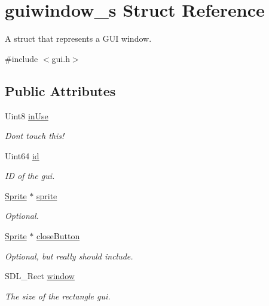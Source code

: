 \hypertarget{structguiwindow__s}{}\section{guiwindow\+\_\+s Struct Reference}
\label{structguiwindow__s}


A struct that represents a G\+UI window.  




{\ttfamily \#include $<$gui.\+h$>$}

\subsection*{Public Attributes}
\begin{DoxyCompactItemize}
\item 
\mbox{\label{structguiwindow__s_a31241d3d16a5e55ea1025fd08e5835bd}} 
Uint8 \hyperlink{structguiwindow__s_a31241d3d16a5e55ea1025fd08e5835bd}{in\+Use}
\begin{DoxyCompactList}\small\item\em Don\textquotesingle{}t touch this! \end{DoxyCompactList}\item 
Uint64 \hyperlink{structguiwindow__s_a8517fe666071281d8060f4f59459623f}{id}
\begin{DoxyCompactList}\small\item\em ID of the gui. \end{DoxyCompactList}\item 
\hyperlink{struct_sprite___s}{Sprite} $\ast$ \hyperlink{structguiwindow__s_a44df1a42aae23bae63ec9a7a9243b80e}{sprite}
\begin{DoxyCompactList}\small\item\em Optional. \end{DoxyCompactList}\item 
\hyperlink{struct_sprite___s}{Sprite} $\ast$ \hyperlink{structguiwindow__s_ac2a0369e93d29393cf3b5353a989dc9b}{close\+Button}
\begin{DoxyCompactList}\small\item\em Optional, but really should include. \end{DoxyCompactList}\item 
S\+D\+L\+\_\+\+Rect \hyperlink{structguiwindow__s_a4f1cb1337e6c6ea0924a54bbc411a1ce}{window}
\begin{DoxyCompactList}\small\item\em The size of the rectangle gui. \end{DoxyCompactList}\item 

\end{DoxyCompactItemize}
